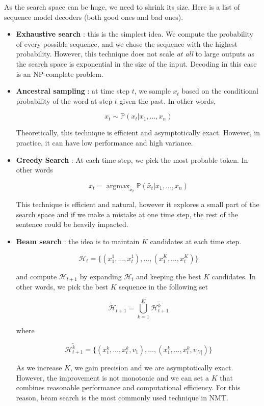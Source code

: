 \documentclass{tufte-handout}
\begin{document}
As the search space can be huge, we need to shrink its size. Here is a list of sequence model decoders (both good ones and bad ones).
\begin{itemize}
\item \textbf{Exhaustive search} : this is the simplest idea. We compute the probability of every possible sequence, and we chose the sequence with the highest probability. However, this technique does not scale \emph{at all} to large outputs as the search space is exponential in the size of the input. Decoding in this case is an NP-complete problem.
\item \textbf{Ancestral sampling} : at time step $ t$, we sample $ x_t $  based on the conditional probability of the word at step $ t$ given the past. In other words, 

$$ x_t \sim \mathbb{P}( x_t | x_1, \ldots, x_n) $$

Theoretically, this technique is efficient and asymptotically exact. However, in practice, it can have low performance and high variance.
\item \textbf{Greedy Search} :  At each time step, we pick the most probable token. In other words

$$ x_t = \operatorname{argmax}_{\tilde{x_t}} \mathbb{P}( \tilde{x_t} | x_1, \ldots, x_n) $$

This technique is efficient and natural, however it explores a small part of the search space and if we make a mistake at one time step, the rest of the sentence could be heavily impacted.
\item \textbf{Beam search} : the idea is to maintain $ K $ candidates at each time step.

$$ \mathcal{H}_t = \{ (x_1^1, \ldots, x_t^1), \ldots, (x_1^K, \ldots, x_t^K) \} $$

and compute $ \mathcal{H}_{t+1} $ by expanding $ \mathcal{H}_t $ and keeping the best $ K $ candidates. In other words, we pick the best $ K $ sequence in the following set

$$ \tilde{\mathcal{H}}_{t+1} = \bigcup_{k=1}^K \tilde{\mathcal{H}_{t+1}^k}$$

where 

$$ \tilde{\mathcal{H}_{t+1}^k} = \{ (x_1^k, \ldots, x_t^k, v_1), \ldots,  (x_1^k, \ldots, x_t^k, v_{|V|})\}$$

As we increase $ K $, we gain precision and we are asymptotically exact. However, the improvement is not monotonic and we can set a $ K $ that combines reasonable performance and computational efficiency. For this reason, beam search is the most commonly used technique in NMT.
\end{itemize}
\end{document}
